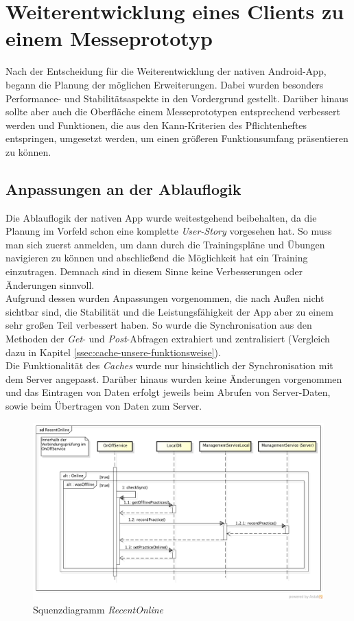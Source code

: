 \chapter{Weiterentwicklung eines Clients zu einem Messeprototyp}
\label{cha:weiterentwicklung-messeprototyp}
Nach der Entscheidung für die Weiterentwicklung der nativen Android-App, begann die Planung der möglichen Erweiterungen. Dabei wurden besonders Performance- und Stabilitätsaspekte in den Vordergrund gestellt. Darüber hinaus sollte aber auch die Oberfläche einem Messeprototypen entsprechend verbessert werden und Funktionen, die aus den Kann-Kriterien des Pflichtenheftes entspringen, umgesetzt werden, um einen größeren Funktionsumfang präsentieren zu können.

\section{Anpassungen an der Ablauflogik}
\label{sec:anpassungen-ablauflogik}
Die Ablauflogik der nativen App wurde weitestgehend beibehalten, da die Planung im Vorfeld schon eine komplette \textit{User-Story} vorgesehen hat. So muss man sich zuerst anmelden, um dann durch die Trainingspläne und Übungen navigieren zu können und abschließend die Möglichkeit hat ein Training einzutragen. Demnach sind in diesem Sinne keine Verbesserungen oder Änderungen sinnvoll.\\
Aufgrund dessen wurden Anpassungen vorgenommen, die nach Außen nicht sichtbar sind, die Stabilität und die Leistungsfähigkeit der App aber zu einem sehr großen Teil verbessert haben. So wurde die Synchronisation aus den Methoden der \textit{Get}- und \textit{Post}-Abfragen extrahiert und zentralisiert (Vergleich dazu in Kapitel \ref{ssec:cache-unsere-funktionsweise}).\\
Die Funktionalität des \textit{Caches} wurde nur hinsichtlich der Synchronisation mit dem Server angepasst.  Darüber hinaus wurden keine Änderungen vorgenommen und das Eintragen von Daten erfolgt jeweils beim Abrufen von Server-Daten, sowie beim Übertragen von Daten zum Server.
\begin{figure}[h]
\centering
\includegraphics[width=\linewidth]{content/images/fITNat-RecentOnline}
\caption{Squenzdiagramm \textit{RecentOnline}}
\label{pic:nat-RecentOnline}
\end{figure}
